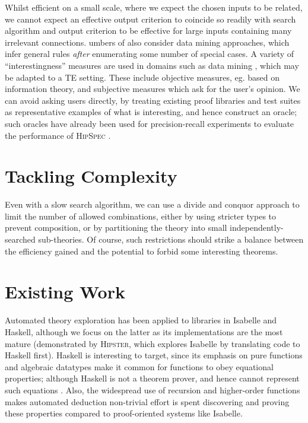 \documentclass[]{article}
\begin{document}
Whilst efficient on a small scale, where we expect the chosen inputs to
be related, we cannot expect an effective output criterion to coincide
so readily with search algorithm and output criterion to be effective
for large inputs containing many irrelevant connections. umbers of also
consider data mining approaches, which infer general rules \emph{after}
enumerating some number of special cases. A variety of
``interestingness'' measures are used in domains such as data mining
\cite{geng2006interestingness}, which may be adapted to a TE setting. These
include objective measures, eg. based on information theory, and
subjective measures which ask for the user's opinion. We can avoid
asking users directly, by treating existing proof libraries and test
suites as representative examples of what is interesting, and hence
construct an oracle; such oracles have already been used for
precision-recall experiments to evaluate the performance of
\textsc{HipSpec} \cite{claessen2013automating}.

\section{Tackling Complexity}\label{tackling-complexity}

Even with a slow search algorithm, we can use a divide and conquor
approach to limit the number of allowed combinations, either by using
stricter types to prevent composition, or by partitioning the theory
into small independently-searched sub-theories. Of course, such
restrictions should strike a balance between the efficiency gained and
the potential to forbid some interesting theorems.

\section{Existing Work}\label{existing-work}

Automated theory exploration has been applied to libraries in Isabelle
and Haskell, although we focus on the latter as its implementations are
the most mature (demonstrated by \textsc{Hipster}, which explores Isabelle by
translating code to Haskell first). Haskell is interesting to target,
since its emphasis on pure functions and algebraic datatypes make it common for
functions to obey equational properties; although Haskell is not a theorem prover,
and hence cannot represent such equations . Also, the widespread use of
recursion and higher-order functions makes automated deduction non-trivial
effort is spent discovering and proving these properties compared to
proof-oriented systems like Isabelle.
\end{document}
